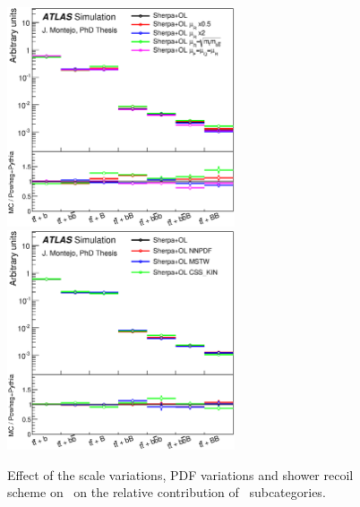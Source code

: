 \begin{figure}[p]
\begin{center}
\includegraphics[width=0.6\textwidth]{Modeling/Figures/scales_realHFbb_extHFtype_norm.eps} \\
\includegraphics[width=0.6\textwidth]{Modeling/Figures/other_realHFbb_extHFtype_norm.eps} 
\caption{Effect of the scale variations, PDF variations and shower recoil scheme on \ShOL\ on the relative contribution of \ttbb\ subcategories.}
\label{fig:scales_other_extHFtype_app}
\end{center}
\end{figure}

